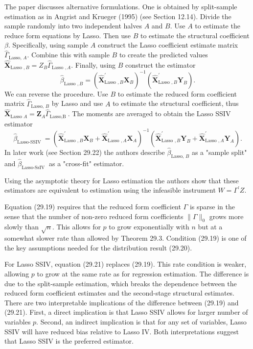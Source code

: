 The paper discusses alternative formulations. One is obtained by split-sample estimation as in Angrist and Krueger (1995) (see Section 12.14). Divide the sample randomly into two independent halves $A$ and $B$. Use $A$ to estimate the reduce form equations by Lasso. Then use $B$ to estimate the structural coefficient $\beta$. Specifically, using sample $A$ construct the Lasso coefficient estimate matrix $\widehat{\Gamma}_{\text {Lasso, } A}$. Combine this with sample $B$ to create the predicted values $\widehat{\boldsymbol{X}}_{\text {Lasso }, B}=Z_{B} \widehat{\Gamma}_{\text {Lasso }, A}$. Finally, using $B$ construct the estimator
$$
\widehat{\beta}_{\text {Lasso }, B}=\left(\widehat{\boldsymbol{X}}_{\text {Lasso }, B}^{\prime} \boldsymbol{X}_{B}\right)^{-1}\left(\widehat{\boldsymbol{X}}_{\text {Lasso }, B}^{\prime} \boldsymbol{Y}_{B}\right) .
$$
We can reverse the procedure. Use $B$ to estimate the reduced form coefficient matrix $\widehat{\Gamma}_{\text {Lasso, } B}$ by Lasso and use $A$ to estimate the structural coefficient, thus $\widehat{\boldsymbol{X}}_{\text {Lasso } A}=\boldsymbol{Z}_{A} \widehat{\Gamma}_{\text {Lasso,B }}$. The moments are averaged to obtain the Lasso SSIV estimator
$$
\widehat{\beta}_{\text {Lasso-SSIV }}=\left(\widehat{\boldsymbol{X}}_{\text {Lasso }, B}^{\prime} \boldsymbol{X}_{B}+\widehat{\boldsymbol{X}}_{\text {Lasso }, A}^{\prime} \boldsymbol{X}_{A}\right)^{-1}\left(\widehat{\boldsymbol{X}}_{\text {Lasso }, B}^{\prime} \boldsymbol{Y}_{B}+\widehat{\boldsymbol{X}}_{\text {Lasso }, A}^{\prime} \boldsymbol{Y}_{A}\right) .
$$
In later work (see Section 29.22) the authors describe $\widehat{\beta}_{\text {Lasso, } B}$ as a "sample split" and $\widehat{\beta}_{\text {Lasso-SsIV }}$ as a "cross-fit" estimator.

Using the asymptotic theory for Lasso estimation the authors show that these estimators are equivalent to estimation using the infeasible instrument $W=\Gamma^{\prime} Z$.

Equation (29.19) requires that the reduced form coefficient $\Gamma$ is sparse in the sense that the number of non-zero reduced form coefficients $\|\Gamma\|_{0}$ grows more slowly than $\sqrt{n}$. This allows for $p$ to grow exponentially with $n$ but at a somewhat slower rate than allowed by Theorem 29.3. Condition (29.19) is one of the key assumptions needed for the distribution result (29.20).

For Lasso SSIV, equation (29.21) replaces (29.19). This rate condition is weaker, allowing $p$ to grow at the same rate as for regression estimation. The difference is due to the split-sample estimation, which breaks the dependence between the reduced form coefficient estimates and the second-stage structural estimates. There are two interpretable implications of the difference between (29.19) and (29.21). First, a direct implication is that Lasso SSIV allows for larger number of variables $p$. Second, an indirect implication is that for any set of variables, Lasso SSIV will have reduced bias relative to Lasso IV. Both interpretations suggest that Lasso SSIV is the preferred estimator.

